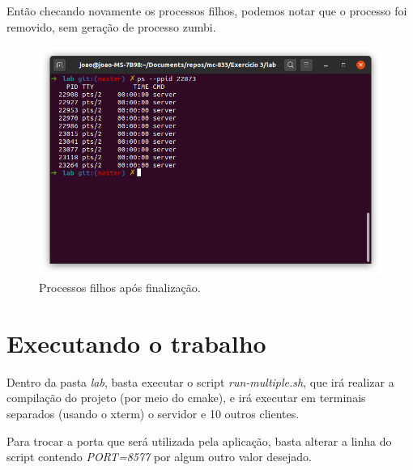 \documentclass[12pt,a4paper]{report}
\begin{document}
Então checando novamente os processos filhos, podemos notar que o processo foi removido, sem geração de processo zumbi.
\begin{figure}[H]
  \includegraphics[width=\linewidth]{before.png}
  \caption{Processos filhos após finalização.}
\end{figure}

\section{Executando o trabalho}

Dentro da pasta \emph{lab}, basta executar o script \emph{run-multiple.sh}, que irá realizar a compilação do projeto (por meio do cmake), e irá executar em terminais separados (usando o xterm) o servidor e 10 outros clientes.

\bigskip

Para trocar a porta que será utilizada pela aplicação, basta alterar a linha do script contendo \emph{PORT=8577} por algum outro valor desejado.




\end{document}
